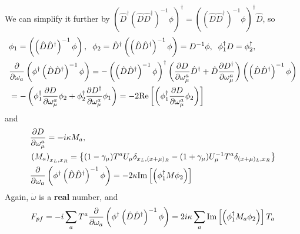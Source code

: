 We can simplify it further by $\left(\hat{D}^{\dagger}(\hat{D}\hat{D}^{\dagger})^{-1}\phi\right)^{\dagger}=\left((\hat{D}\hat{D}^{\dagger})^{-1}\phi\right)^{\dagger}\hat{D}$, so
\begin{equation}
\begin{split}
&\phi _1=\left(\left(\hat{D}\hat{D}^{\dagger}\right)^{-1}\phi\right),\;\;
 \phi _2=\hat{D}^{\dagger}\left(\left(\hat{D}\hat{D}^{\dagger}\right)^{-1}\phi\right)=D^{-1}\phi,\;\;\phi _1^{\dagger}D=\phi _2^{\dagger},\\
&\frac{\partial}{\partial \omega_a} \left(\phi ^{\dagger}\left(\hat{D}\hat{D}^{\dagger}\right)^{-1}\phi\right)=-\left(\left(\hat{D}\hat{D}^{\dagger}\right)^{-1}\phi\right)^{\dagger}\left(\frac{\partial D}{\partial \omega _{\mu}^a}\hat{D}^{\dagger}+\hat{D}\frac{\partial D^{\dagger}}{\partial \omega _{\mu}^a}\right)\left(\left(\hat{D}\hat{D}^{\dagger}\right)^{-1}\phi\right)\\
&=-\left(\phi _1^{\dagger} \frac{\partial D}{\partial \omega _{\mu}^a} \phi _2+\phi _2^{\dagger} \frac{\partial D^{\dagger}}{\partial \omega _{\mu}^a} \phi _1\right)=-2{\rm Re}\left[\left(\phi _1 ^{\dagger} \frac{\partial D}{\partial \omega _{\mu}^a} \phi _2\right)\right]\\
\end{split}
\end{equation}
and
\begin{equation}
\begin{split}
&\frac{\partial D}{\partial \omega _{\mu}^a}=-i\kappa M_a,\\
&\left(M_a\right)_{x_L,x_R}=\left\{(1-\gamma _{\mu})T^aU_{\mu}\delta _{x_L,(x+\mu)_R}-(1+\gamma _{\mu})U_{\mu}^{-1}T^a\delta _{(x+\mu)_L,x_R}\right\}\\
&\frac{\partial}{\partial \omega_a} \left(\phi ^{\dagger}\left(\hat{D}\hat{D}^{\dagger}\right)^{-1}\phi\right)=-2\kappa{\rm Im}\left[\left(\phi _1 ^{\dagger} M \phi _2\right)\right]\\
\end{split}
\end{equation}
Again, $\dot{\omega}$ is a \textbf{real} number, and
\begin{equation}
\begin{split}
&F_{pf}=-i\sum _a T^a \frac{\partial}{\partial \omega_a} \left(\phi ^{\dagger}\left(\hat{D}\hat{D}^{\dagger}\right)^{-1}\phi\right)=2i\kappa \sum _a {\rm Im}\left[\left(\phi _1 ^{\dagger} M_a \phi _2\right)\right] T_a\\
\end{split}
\end{equation}

